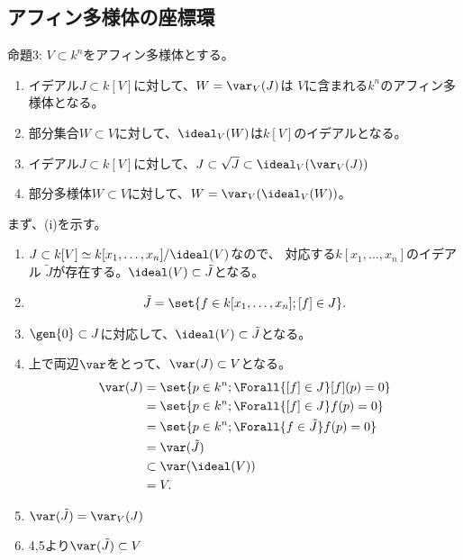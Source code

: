 \subsection{アフィン多様体の座標環}
\label{sub:アフィン多様体の座標環}

\begin{framed}
命題3:
$V\subset k^n$をアフィン多様体とする。
\begin{enumerate}[label=(\roman*)]
  \item イデアル$J\subset k[V]$に対して、$W=\var_V(J)$は
  $V$に含まれる$k^n$のアフィン多様体となる。
  \item
  部分集合$W\subset V$に対して、$\ideal_V(W)$は$k[V]$のイデアルとなる。
  \item
  イデアル$J\subset k[V]$に対して、$J\subset \sqrt{J} \subset \ideal_V(\var_V(J))$
  \item
  部分多様体$W\subset V$に対して、$W=\var_V(\ideal_V(W))$。
\end{enumerate}
\end{framed}
まず、(i)を示す。
\begin{enumerate}
  \item
  $J \subset k[V] \simeq k[x_1,\dots,x_n]/\ideal(V)$なので、
  対応する$k[x_1,\dots,x_n]$のイデアル
  $\tilde J$が存在する。$\ideal(V) \subset \tilde J$となる。
  \item
  \begin{align}
    \tilde J = \set{f \in k[x_1,\dots,x_n]; [f]\in J}.
  \end{align}
  \item
  $\gen{0}\subset J$に対応して、$\ideal(V) \subset \tilde J$となる。
  \item
  上で両辺$\var$をとって、$\var(J)\subset V$となる。
  \begin{align}
    \var(J)
    &=
    \set{p\in k^n; \Forall{[f]\in J}[f](p)=0}\\
    &=
    \set{p\in k^n; \Forall{[f]\in J}f(p)=0}\\
    &=
    \set{p\in k^n; \Forall{f\in \tilde J} f(p)=0}\\
    &=
    \var(\tilde J)\\
    &\subset
    \var(\ideal(V))\\
    &=
    V.
  \end{align}
  \item
  $\var(\tilde J) = \var_V(J)$
  \item 4,5より$\var(\tilde J) \subset V$
\end{enumerate}

